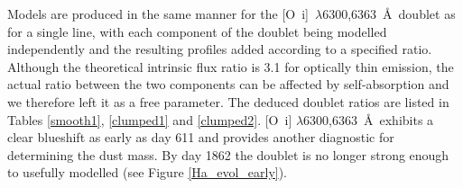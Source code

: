 \documentclass[useAMS,usenatbib,usegraphicx]{mnras}
\begin{document}
Models are produced in the same manner for the 
[O~{\sc i}]~$\lambda$6300,6363~\AA\ doublet as for a single line, with each component 
of the doublet being modelled independently and the resulting profiles 
added according to a specified ratio.  Although the theoretical intrinsic flux ratio 
is 3.1 for optically thin emission, the actual ratio between the two components can be 
affected by self-absorption \citep{Li1992} and we therefore 
left it as a free parameter.  The deduced doublet ratios are listed in Tables \ref{smooth1}, \ref{clumped1} and \ref{clumped2}.  [O~{\sc i}] 
$\lambda$6300,6363~\AA\ exhibits a clear blueshift as early as day 611 
and provides another diagnostic for determining the dust mass.  By day 1862 
the doublet is no longer strong enough to usefully 
modelled (see Figure \ref{Ha_evol_early}).
\end{document}
